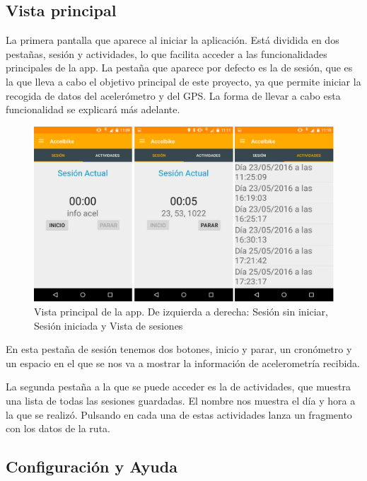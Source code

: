 \subsection{Vista principal}
\label{makereference6.1.1}

La primera pantalla que aparece al iniciar la aplicación. Está dividida en dos pestañas, sesión y actividades, lo que facilita acceder a las funcionalidades principales de la app. La pestaña que aparece por defecto es la de sesión, que es la que lleva a cabo el objetivo principal de este proyecto, ya que permite iniciar la recogida de datos del acelerómetro y del GPS. La forma de llevar a cabo esta funcionalidad se explicará más adelante.

\begin{figure}[h]%
	\centering
    \includegraphics[width=\linewidth]{figures/app_tabfragment.png} %
    \caption[Vista principal de la app Android]{Vista principal de la app. De izquierda a derecha: Sesión sin iniciar, Sesión iniciada y Vista de sesiones}
   	\label{figuraAPPPrincipal}
\end{figure}

En esta pestaña de sesión tenemos dos botones, inicio y parar, un cronómetro y un espacio en el que se nos va a mostrar la información de acelerometría recibida.

La segunda pestaña a la que se puede acceder es la de actividades, que muestra una lista de todas las sesiones guardadas. El nombre nos muestra el día y hora a la que se realizó. Pulsando en cada una de estas actividades lanza un fragmento con los datos de la ruta.


\subsection{Configuración y Ayuda}
\label{makereference6.1.2}

